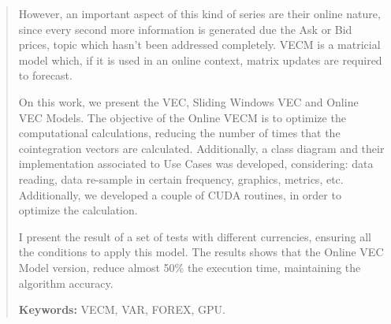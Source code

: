 \begin{quotation}
However, an important aspect of this kind of series are their online nature,
since every second more information is generated due the Ask or Bid prices,
topic which hasn't been addressed completely.  VECM is a matricial model which,
if it is used in an online context, matrix updates are required to forecast.


On this work, we present the VEC, Sliding Windows VEC and Online VEC Models.
The objective of the Online VECM is to optimize the computational calculations,
reducing the number of times that the cointegration vectors are calculated.
Additionally, a class diagram and their implementation associated to Use Cases
was developed, considering: data reading, data re-sample in certain frequency,
graphics, metrics, etc. Additionally, we developed a couple of CUDA routines,
in order to optimize the calculation.


I present the result of a set of tests with different currencies, ensuring all
the conditions to apply this model. The results shows that the Online VEC Model
version, reduce almost 50\% the execution time, maintaining the algorithm
accuracy. 


{\bf Keywords:} VECM, VAR, FOREX, GPU.
\end{quotation}

